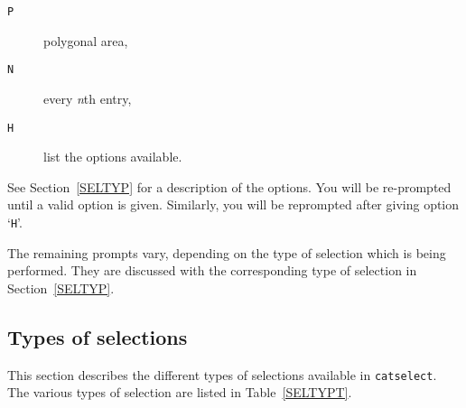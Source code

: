 \documentclass[twoside,11pt]{article}
\renewcommand{\_}{\texttt{\symbol{95}}}
\begin{document}
\begin{description}
\begin{description}
    \item[ {\tt P} ] polygonal area,

    \item[ {\tt N} ] every {\it n}th entry,

    \item[ {\tt H} ] list the options available.

  \end{description}

   See Section~\ref{SELTYP} for a description of the options.  You will
   be re-prompted until a valid option is given.  Similarly, you will be
   reprompted after giving option `{\tt H}'.

\end{description}

The remaining prompts vary, depending on the type of selection which is
being performed.  They are discussed with the corresponding type of
selection in Section~\ref{SELTYP}.

\subsection{\label{SELTYP}Types of selections}

This section describes the different types of selections available in
{\tt catselect}.  The various types of selection are listed in
Table~\ref{SELTYPT}.
\end{document}
